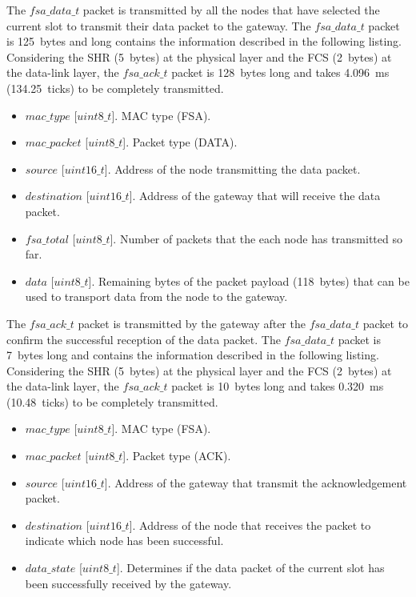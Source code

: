 The $fsa\_data\_t$ packet is transmitted by all the nodes that have selected the current slot to transmit their data packet to the gateway. The $fsa\_data\_t$ packet is 125~bytes and long contains the information described in the following listing. Considering the SHR (5~bytes) at the physical layer and the FCS (2~bytes) at the data-link layer, the $fsa\_ack\_t$ packet is 128~bytes long and takes 4.096~ms (134.25~ticks) to be completely transmitted.
\begin{itemize}
\item $mac\_type$ [$uint8\_t$]. MAC type (FSA).
\item $mac\_packet$ [$uint8\_t$]. Packet type (DATA).
\item $source$ [$uint16\_t$]. Address of the node transmitting the data packet.
\item $destination$ [$uint16\_t$]. Address of the gateway that will receive the data packet.
\item $fsa\_total$ [$uint8\_t$]. Number of packets that the each node has transmitted so far.
\item $data$ [$uint8\_t$]. Remaining bytes of the packet payload (118~bytes) that can be used to transport data from the node to the gateway.
\end{itemize}

The $fsa\_ack\_t$ packet is transmitted by the gateway after the $fsa\_data\_t$ packet to confirm the successful reception of the data packet. The $fsa\_data\_t$ packet is 7~bytes long and contains the information described in the following listing. Considering the SHR (5~bytes) at the physical layer and the FCS (2~bytes) at the data-link layer, the $fsa\_ack\_t$ packet is 10~bytes long and takes 0.320~ms (10.48~ticks) to be completely transmitted.
\begin{itemize}
\item $mac\_type$ [$uint8\_t$]. MAC type (FSA).
\item $mac\_packet$ [$uint8\_t$]. Packet type (ACK).
\item $source$ [$uint16\_t$]. Address of the gateway that transmit the acknowledgement packet.
\item $destination$ [$uint16\_t$]. Address of the node that receives the packet to indicate which node has been successful.
\item $data\_state$ [$uint8\_t$]. Determines if the data packet of the current slot has been successfully received by the gateway.
\end{itemize}

